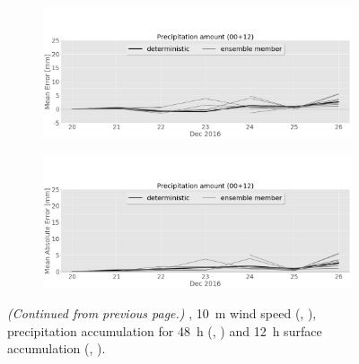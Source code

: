 \begin{figure}
\begin{subfigure}[b]{0.49\textwidth}
		\caption{}\label{fig:MAE:precip}
	\end{subfigure}
	\begin{subfigure}[b]{0.49\textwidth}
		\includegraphics[width=\textwidth]{./fig_sfc_precip/ME12_20161220_26_00}
		\caption{}\label{fig:bias:precip12}
	\end{subfigure}
	\begin{subfigure}[b]{0.49\textwidth}
		\includegraphics[width=\textwidth]{./fig_sfc_precip/MAE12_20161220_26_00}
		\caption{}\label{fig:MAE:precip12}
	\end{subfigure}
	\caption{\textit{(Continued from previous page.)} ,  \SI{10}{\metre} wind speed (\protect{}, \protect{}), precipitation accumulation for \SI{48}{\hour} (\protect{}, \protect{}) and \SI{12}{\hour} surface accumulation (\protect{}, \protect{}). }    
\end{figure}
